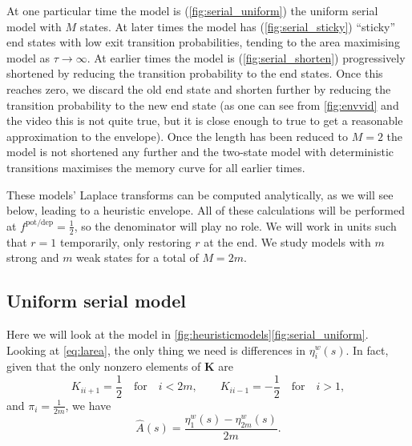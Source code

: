 \documentclass[12pt]{article}
\newcommand{\eqm}{\pi}
\newcommand{\etwm}{\eta^w}
\newcommand{\encm}{K}
\newcommand{\enc}{\mathbf{\encm}}
\newcommand{\potdep}{^{\text{pot/dep}}}
\begin{document}
At one particular time the model is (\ref{fig:serial_uniform}) the uniform serial model with \(M\) states.
At later times the model has (\ref{fig:serial_sticky}) ``sticky'' end states with low exit transition probabilities, tending to the area maximising model as \(\tau \to \infty\).
At earlier times the model is (\ref{fig:serial_shorten}) progressively shortened by reducing the transition probability to the end states.
Once this reaches zero, we discard the old end state and shorten further by reducing the transition probability to the new end state (as one can see from \cref{fig:envvid} and the video this is not quite true, but it is close enough to true to get a reasonable approximation to the envelope).
Once the length has been reduced to \(M=2\) the model is not shortened any further and the two-state model with deterministic transitions maximises the memory curve for all earlier times.

These models' Laplace transforms can be computed analytically, as we will see below, leading to a heuristic envelope.
All of these calculations will be performed at \(f\potdep=\frac{1}{2}\), so the denominator will play no role.
We will work in units such that \(r=1\) temporarily, only restoring \(r\) at the end.
We study models with \(m\) strong and \(m\) weak states for a total of  \(M = 2 m\).


\subsection{Uniform serial model}\label{sec:serial_uniform}

Here we will look at the model in \cref{fig:heuristicmodels}\ref{fig:serial_uniform}.
Looking at \eqref{eq:larea}, the only thing we need is differences in \(\etwm_i(s)\).
In fact, given that the only nonzero elements of \(\enc\) are
%
\begin{equation}\label{eq:unienc}
  \encm_{ii+1}=\frac{1}{2} \quad\text{for}\quad i<2m,
  \qquad
  \encm_{ii-1}=-\frac{1}{2} \quad\text{for}\quad i>1,
\end{equation}
%
and \(\eqm_i = \frac{1}{2m}\), we have
%
\begin{equation}\label{eq:uniareaeta}
  \hat{A}(s) = \frac{\etwm_1(s) - \etwm_{2m}(s)}{2m}.
\end{equation}
%
\end{document}
